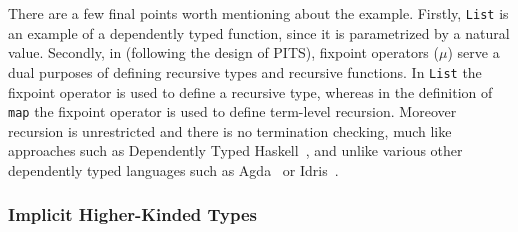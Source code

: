 There are a few final points worth mentioning about the example.
Firstly, \verb|List| is an example of a dependently typed function, since it is parametrized
by a natural value. Secondly, in \name (following the design of PITS),
fixpoint operators ($\mu$) serve a dual purposes of defining recursive types and recursive
functions. In \verb|List| the fixpoint operator is used to define a recursive type, whereas
in the definition of \verb|map| the fixpoint operator is used to define term-level recursion.
Moreover recursion is unrestricted and there is no termination checking, much like approaches
such as Dependently Typed Haskell~\cite{}, and unlike various other dependently typed languages
such as Agda~\cite{} or Idris~\cite{}.


\begin{comment}
  can not only be types, also values of other data types
(in this case, $\Nat$). So our language is able to directly encode the behavior of
``Datatype Promotion'' of GHC haskell. The type parameters of $\List$ at most
positions can be implicit parameter and instantiated during application.

\paragraph{Fixpoint Operators}
In our language, fixpoint operators ($\mu$) serves a dual purposes of defining
recursive data type and recursive functions. However we put restrictions on
fixpoint that its type can not be poly-type. So there is an awkward indirection
in the definition of $\map$ to make all of the type parameters implicit. The rationale
of this restriction is discussed in later sections.

\paragraph{Explicit Type-Level Computations}
The type-level computations of our language do not happen implicitly, they happen
explicitly when $\mathrm{cast}$ operators are used. $\castdn$ and $\castup$
generalize the ``unfold'' and ``fold'' of Iso-Recursive Types and invoke
one-step reduction or expansion respectively at type-level.
They also serve a role of wrapping and unwrapping the abstraction of data types.
\end{comment}

\subsubsection{Implicit Higher-Kinded Types}

